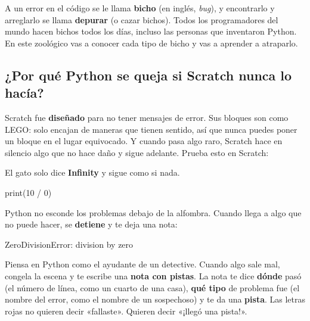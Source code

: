 
A un error en el código se le llama \textbf{bicho} (en inglés, \textit{bug}), y encontrarlo y arreglarlo se llama \textbf{depurar} (o cazar bichos). Todos los programadores del mundo hacen bichos todos los días, incluso las personas que inventaron Python. En este zoológico vas a conocer cada tipo de bicho y vas a aprender a atraparlo.

\subsection*{¿Por qué Python se queja si Scratch nunca lo hacía?}

Scratch fue \textbf{diseñado} para no tener mensajes de error. Sus bloques son como LEGO: solo encajan de maneras que tienen sentido, así que nunca puedes poner un bloque en el lugar equivocado. Y cuando pasa algo raro, Scratch hace en silencio algo que no hace daño y sigue adelante. Prueba esto en Scratch:

\begin{tcbraster}[raster columns=2, raster equal height=rows, raster column skip=12pt, raster valign=center]
\begin{tcolorbox}[colback=white, colframe=white, boxrule=0pt, valign=center]
\begin{scratch}
\end{scratch}
\par\smallskip\small El gato solo dice \textbf{Infinity} y sigue como si nada.
\end{tcolorbox}
\begin{code}
print(10 / 0)
\end{code}
\end{tcbraster}

Python no esconde los problemas debajo de la alfombra. Cuando llega a algo que no puede hacer, se \textbf{detiene} y te deja una nota:

\begin{bzerror}
ZeroDivisionError: division by zero
\end{bzerror}

Piensa en Python como el ayudante de un detective. Cuando algo sale mal, congela la escena y te escribe una \textbf{nota con pistas}. La nota te dice \textbf{dónde} pasó (el número de línea, como un cuarto de una casa), \textbf{qué tipo} de problema fue (el nombre del error, como el nombre de un sospechoso) y te da una \textbf{pista}. Las letras rojas no quieren decir «fallaste». Quieren decir «¡llegó una pista!».

